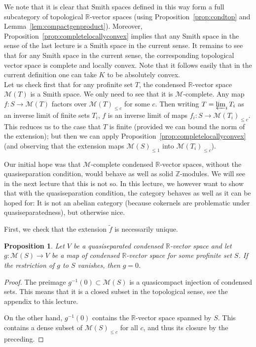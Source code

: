 \documentclass[11pt]{amsbook}
\renewcommand*{\tilde}{\widetilde}
\numberwithin{equation}{section}
\numberwithin{theorem}{section}
\newtheorem{proposition}[theorem]{Proposition}
\theoremstyle{definition}
\begin{document}
We note that it is clear that Smith spaces defined in this way form a full subcategory of topological $\mathbb R$-vector spaces (using Proposition~\ref{prop:condtop} and Lemma~\ref{lem:compactgenproduct}). Moreover, Proposition~\ref{prop:completelocallyconvex} implies that any Smith space in the sense of the last lecture is a Smith space in the current sense. It remains to see that for any Smith space in the current sense, the corresponding topological vector space is complete and locally convex. Note that it follows easily that in the current definition one can take $K$ to be absolutely convex.\\

Let us check first that for any profinite set $T$, the condensed $\mathbb R$-vector space $\mathcal M(T)$ is a Smith space. We only need to see that it is $\mathcal M$-complete. Any map $f: S\to \mathcal M(T)$ factors over $\mathcal M(T)_{\leq c}$ for some $c$. Then writing $T=\varprojlim_i T_i$ as an inverse limit of finite sets $T_i$, $f$ is an inverse limit of maps $f_i: S\to \mathcal M(T_i)_{\leq c}$. This reduces us to the case that $T$ is finite (provided we can bound the norm of the extension); but then we can apply Proposition~\ref{prop:completelocallyconvex} (and observing that the extension maps $\mathcal M(S)_{\leq 1}$ into $\mathcal M(T_i)_{\leq c}$).

Our initial hope was that $\mathcal M$-complete condensed $\mathbb R$-vector spaces, without the quasiseparation condition, would behave as well as solid $\mathbb Z$-modules. We will see in the next lecture that this is not so. In this lecture, we however want to show that with the quasiseparation condition, the category behaves as well as it can be hoped for: It is not an abelian category (because cokernels are problematic under quasiseparatedness), but otherwise nice.

First, we check that the extension $\tilde{f}$ is necessarily unique.

\begin{proposition} Let $V$ be a quasiseparated condensed $\mathbb R$-vector space and let $g: \mathcal M(S)\to V$ be a map of condensed $\mathbb R$-vector space for some profinite set $S$. If the restriction of $g$ to $S$ vanishes, then $g=0$.
\end{proposition}

\begin{proof} The preimage $g^{-1}(0)\subset \mathcal M(S)$ is a quasicompact injection of condensed sets. This means that it is a closed subset in the topological sense, see the appendix to this lecture.

On the other hand, $g^{-1}(0)$ contains the $\mathbb R$-vector space spanned by $S$. This contains a dense subset of $\mathcal M(S)_{\leq c}$ for all $c$, and thus its closure by the preceding.
\end{proof}
\end{document}
